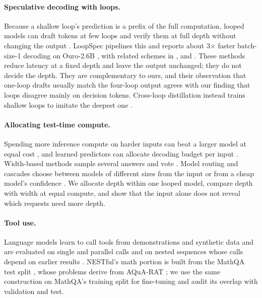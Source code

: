 \paragraph{Speculative decoding with loops.}
Because a shallow loop's prediction is a prefix of the full computation, looped models can
draft tokens at few loops and verify them at full depth without changing the output
\citep{leviathan2023speculative,geiping2025recurrent}. LoopSpec pipelines this and reports about
3$\times$ faster batch-size-1 decoding on Ouro-2.6B \citep{cho2026loopspec}, with related
schemes in \citet{ha2026wavefront}, \citet{li2026das} and \citet{liu2026loopahead}. These methods
reduce latency at a fixed depth and leave the output unchanged; they do not decide the depth.
They are complementary to ours, and their observation that one-loop drafts usually match the
four-loop output agrees with our finding that loops disagree mainly on decision tokens.
Cross-loop distillation instead trains shallow loops to imitate the deepest one
\citep{wang2026loopopd}.

\paragraph{Allocating test-time compute.}
Spending more inference compute on harder inputs can beat a larger model at equal cost
\citep{snell2024scaling}, and learned predictors can allocate decoding budget per input
\citep{damani2024learning}. Width-based methods sample several answers and vote
\citep{wang2023selfconsistency}. Model routing and cascades choose between models of different
sizes from the input or from a cheap model's confidence
\citep{chen2024frugalgpt,ong2025routellm,gupta2024cascades}. We allocate depth within one looped
model, compare depth with width at equal compute, and show that the input alone does not reveal
which requests need more depth.

\paragraph{Tool use.}
Language models learn to call tools from demonstrations and synthetic data
\citep{schick2023toolformer,patil2024gorilla,liu2024apigen} and are evaluated on single and
parallel calls \citep{patil2025bfcl} and on nested sequences whose calls depend on earlier
results \citep{basu2024nestful}. NESTful's math portion is built from the MathQA test split
\citep{amini2019mathqa}, whose problems derive from AQuA-RAT \citep{ling2017aqua}; we use the
same construction on MathQA's training split for fine-tuning and audit its overlap with
validation and test.
